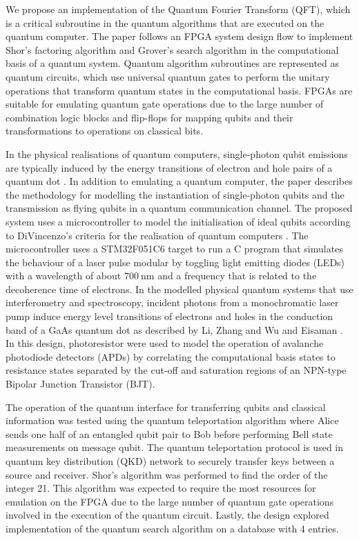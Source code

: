 We propose an implementation of the Quantum Fourier Transform (QFT), which is a critical subroutine in the quantum algorithms that are executed on the quantum computer. The paper follows an FPGA system design flow to implement Shor's factoring algorithm and Grover's search algorithm in the computational basis of a quantum system. Quantum algorithm subroutines are represented as quantum circuits, which use universal \gls{quantum gate}s to perform the \gls{unitary operation}s that transform quantum states in the computational basis. FPGAs are suitable for emulating quantum gate operations due to the large number of combination logic blocks and flip-flops for mapping qubits and their transformations to operations on classical bits. 

In the physical realisations of quantum computers, single-photon qubit emissions are typically induced by the energy transitions of electron and hole pairs of a \gls{quantum dot} \cite{hours2003single, stievater2001rabi}. In addition to emulating a quantum computer, the paper describes the methodology for modelling the instantiation of single-photon qubits and the transmission as flying qubits in a quantum communication channel. The proposed system uses a microcontroller to model the initialisation of ideal qubits according to DiVincenzo's criteria for the realisation of quantum computers \cite{divincenzo2000physical}. The microcontroller uses a STM32F051C6 target to run a C program that simulates the behaviour of a laser pulse modular by toggling light emitting diodes (LEDs) with a wavelength of about $\SI{700}{\nano\meter}$ and a frequency that is related to the decoherence time of electrons. In  the modelled physical quantum systems that use interferometry and spectroscopy, incident photons from a monochromatic laser pump induce energy level transitions of electrons and holes in the conduction band of a GaAs quantum dot as described by Li, Zhang and Wu and Eisaman \cite{li2022control, eisaman2011invited}. In this design, photoresistor were used to model the operation of avalanche photodiode detectors (APDs) by correlating the computational basis states to resistance states separated by the cut-off and saturation regions of an NPN-type Bipolar Junction Transistor (BJT). 

The operation of the quantum interface for transferring qubits and classical information was tested using the quantum teleportation algorithm where Alice sends one half of an entangled qubit pair to Bob before performing Bell state measurements on message qubit. The quantum teleportation protocol is used in quantum key distribution (QKD) network to securely transfer keys between a source and receiver. Shor's algorithm was performed to find the order of the integer 21. This algorithm was expected to require the most resources for emulation on the FPGA due to the large number of quantum gate operations involved in the execution of the quantum circuit. Lastly, the design explored implementation of the quantum search algorithm on a database with 4 entries.


